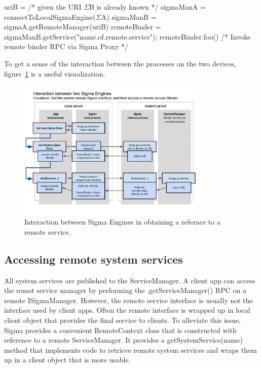 \documentclass[prodmode]{acmlarge}
\begin{document}
\begin{snippet}
uriB = /* given the URI $\Sigma$B is already known */
sigmaManA = connectToLocalSigmaEngine($\Sigma$A)
sigmaManB = sigmaA.getRemoteManager(uriB)
remoteBinder = sigmaManB.getService("name.of.remote.service");
remoteBinder.foo() /* Invoke remote binder RPC via Sigma Proxy */
\end{snippet}

To get a sense of the interaction between the processes on the two devices, figure~\ref{fig:SigmaInteraction} is a useful visualization.

\begin{figure}[h]
\centering
\includegraphics[width=0.8\textwidth]{drawings/SigmaEngineInteraction.pdf}
\caption{Interaction between Sigma Engines in obtaining a refernce to a remote service.}
\label{fig:SigmaInteraction}
\end{figure}

\subsection{Accessing remote system services}
All system services are published to the ServiceManager. A client app can access the remot service manager by performing the .getServiceManager() RPC on a remote ISigmaManager. However, the remote service interface is usually not the interface used by client apps. Often the remote interface is wrapped up in local client object that provides the final service to clients. To alleviate this issue, Sigma provides a convenient RemoteContext class that is constructed with reference to a remote ServiceManager. It provides a getSystemService(name) method that implements code to retrieve remote system services and wraps them up in a client object that is more usable.
\end{document}
